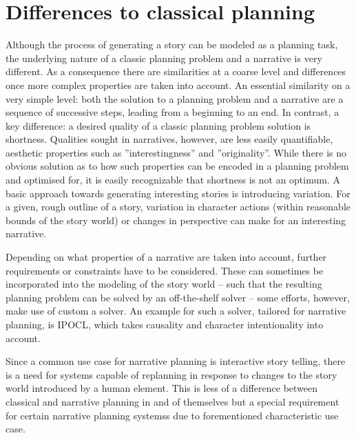 \section{Differences to classical planning}\label{differences}
Although the process of generating a story can be modeled as a planning task, the underlying nature of a classic planning problem and a narrative is very different. As a consequence there are similarities at a coarse level and differences once more complex properties are taken into account. An essential similarity on a very simple level: both the solution to a planning problem and a narrative are a sequence of successive steps, leading from a beginning to an end. In contrast, a key difference: a desired quality of a classic planning problem solution is shortness. Qualities sought in narratives, however, are less easily quantifiable, aesthetic properties such as ''interestingness'' and ''originality''. While there is no obvious solution as to how such properties can be encoded in a planning problem and optimised for, it is easily recognizable that shortness is not an optimum. A basic approach towards generating interesting stories is introducing variation. For a given, rough outline of a story, variation in character actions (within reasonable bounds of the story world) or changes in perspective can make for an interesting narrative.

Depending on what properties of a narrative are taken into account, further requirements or constraints have to be considered. These can sometimes be incorporated into the modeling of the story world -- such that the resulting planning problem can be solved by an off-the-shelf solver -- some efforts, however, make use of custom a solver. An example for such a solver, tailored for narrative planning, is IPOCL\cite{Riedl04}, which takes causality and character intentionality into account.

Since a common use case for narrative planning is interactive story telling, there is a need for systems capable of replanning in response to changes to the story world introduced by a human element. This is less of a difference between classical and narrative planning in and of themselves but a special requirement for certain narrative planning systemss due to forementioned characteristic use case.
%
%
%
